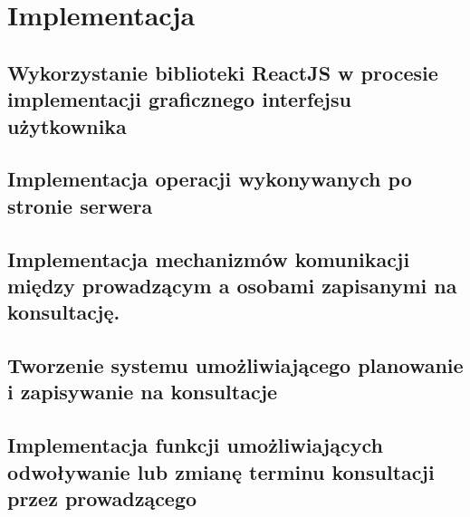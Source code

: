 \clearpage
\chapter{Implementacja}
\section{Wykorzystanie biblioteki ReactJS w procesie implementacji graficznego interfejsu użytkownika}
\section{Implementacja operacji wykonywanych po stronie serwera}
\section{Implementacja mechanizmów komunikacji między prowadzącym a osobami zapisanymi na konsultację.}
\section{Tworzenie systemu umożliwiającego planowanie i zapisywanie na konsultacje}
\section{Implementacja funkcji umożliwiających odwoływanie lub zmianę terminu konsultacji przez prowadzącego}
